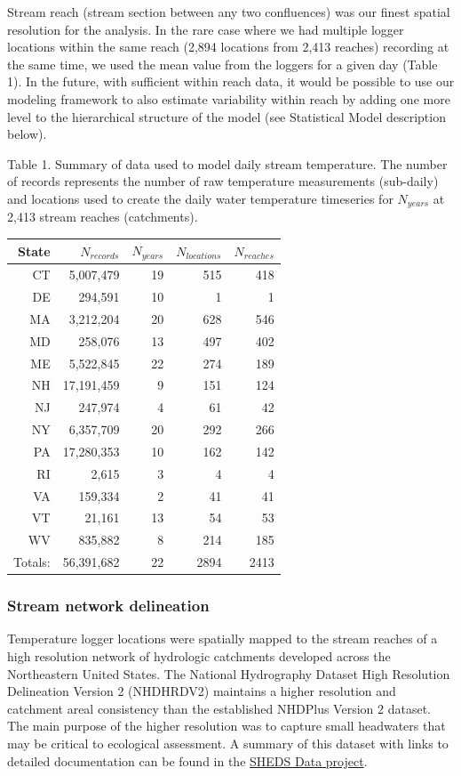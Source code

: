 \documentclass[]{article}
\begin{document}
Stream reach (stream section between any two confluences) was our finest
spatial resolution for the analysis. In the rare case where we had
multiple logger locations within the same reach (2,894 locations from
2,413 reaches) recording at the same time, we used the mean value from
the loggers for a given day (Table 1). In the future, with sufficient
within reach data, it would be possible to use our modeling framework to
also estimate variability within reach by adding one more level to the
hierarchical structure of the model (see Statistical Model description
below).

Table 1. Summary of data used to model daily stream temperature. The
number of records represents the number of raw temperature measurements
(sub-daily) and locations used to create the daily water temperature
timeseries for \(N_{years}\) at 2,413 stream reaches (catchments).

\begin{longtable}[c]{@{}rrrrr@{}}
\toprule
State & \(N_{records}\) & \(N_{years}\) & \(N_{locations}\) &
\(N_{reaches}\)\tabularnewline
\midrule
\endhead
CT & 5,007,479 & 19 & 515 & 418\tabularnewline
DE & 294,591 & 10 & 1 & 1\tabularnewline
MA & 3,212,204 & 20 & 628 & 546\tabularnewline
MD & 258,076 & 13 & 497 & 402\tabularnewline
ME & 5,522,845 & 22 & 274 & 189\tabularnewline
NH & 17,191,459 & 9 & 151 & 124\tabularnewline
NJ & 247,974 & 4 & 61 & 42\tabularnewline
NY & 6,357,709 & 20 & 292 & 266\tabularnewline
PA & 17,280,353 & 10 & 162 & 142\tabularnewline
RI & 2,615 & 3 & 4 & 4\tabularnewline
VA & 159,334 & 2 & 41 & 41\tabularnewline
VT & 21,161 & 13 & 54 & 53\tabularnewline
WV & 835,882 & 8 & 214 & 185\tabularnewline
Totals: & 56,391,682 & 22 & 2894 & 2413\tabularnewline
\bottomrule
\end{longtable}

\subsubsection{Stream network
delineation}\label{stream-network-delineation}

Temperature logger locations were spatially mapped to the stream reaches
of a high resolution network of hydrologic catchments developed across
the Northeastern United States. The National Hydrography Dataset High
Resolution Delineation Version 2 (NHDHRDV2) maintains a higher
resolution and catchment areal consistency than the established NHDPlus
Version 2 dataset. The main purpose of the higher resolution was to
capture small headwaters that may be critical to ecological assessment.
A summary of this dataset with links to detailed documentation can be
found in the \href{http://conte-ecology.github.io/shedsGISData/}{SHEDS
Data project}.
\end{document}
